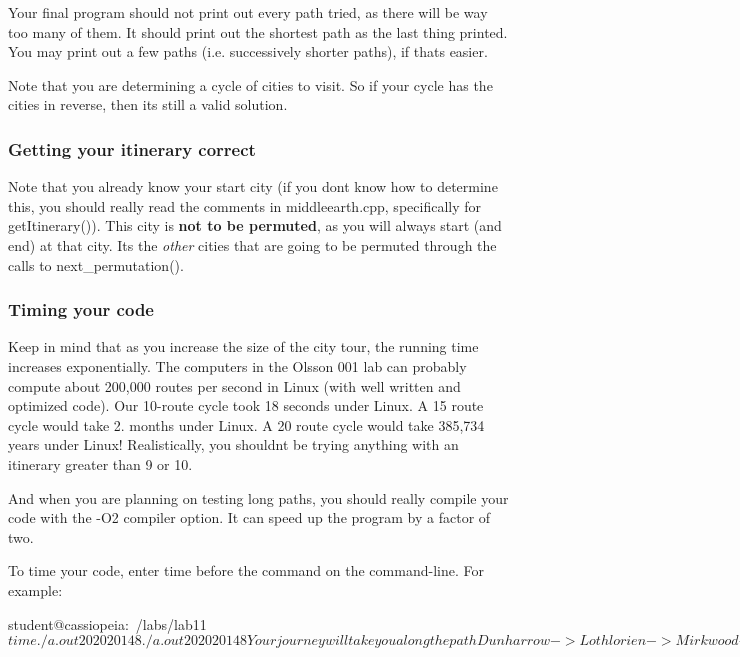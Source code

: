 Your final program should not print out every path tried, as there will be way too many of them. It should print out the shortest path as the last thing printed. You may print out a few paths (i.\+e. successively shorter paths), if that\textquotesingle{}s easier.

Note that you are determining a cycle of cities to visit. So if your cycle has the cities in reverse, then it\textquotesingle{}s still a valid solution.

\subsubsection*{Getting your itinerary correct}

Note that you already know your start city (if you don\textquotesingle{}t know how to determine this, you should really read the comments in middleearth.\+cpp, specifically for {\ttfamily get\+Itinerary()}). This city is {\bfseries not to be permuted}, as you will always start (and end) at that city. It\textquotesingle{}s the {\itshape other} cities that are going to be permuted through the calls to {\ttfamily next\+\_\+permutation()}.

\subsubsection*{Timing your code}

Keep in mind that as you increase the size of the city tour, the running time increases exponentially. The computers in the Olsson 001 lab can probably compute about 200,000 routes per second in Linux (with well written and optimized code). Our 10-\/route cycle took 18 seconds under Linux. A 15 route cycle would take 2. months under Linux. A 20 route cycle would take 385,734 years under Linux! Realistically, you shouldn\textquotesingle{}t be trying anything with an itinerary greater than 9 or 10.

And when you are planning on testing long paths, you should really compile your code with the {\ttfamily -\/\+O2} compiler option. It can speed up the program by a factor of two.

To time your code, enter {\ttfamily time} before the command on the command-\/line. For example\+:


\begin{DoxyCode}
student@cassiopeia:~/labs/lab11$ time ./a.out 20 20 20 14 8
./a.out 20 20 20 14 8
Your journey will take you along the path Dunharrow -> Lothlorien -> Mirkwood -> The Grey Havens -> 
             Minas Tirith -> Weathertop -> Hobbiton -> Edoras -> Cirith Ungol -> Dunharrow
and will have length 53.9495

real    0m0.105s
user    0m0.076s
sys 0m0.020s
student@cassiopeia:~/labs/lab11$ 
\end{DoxyCode}



